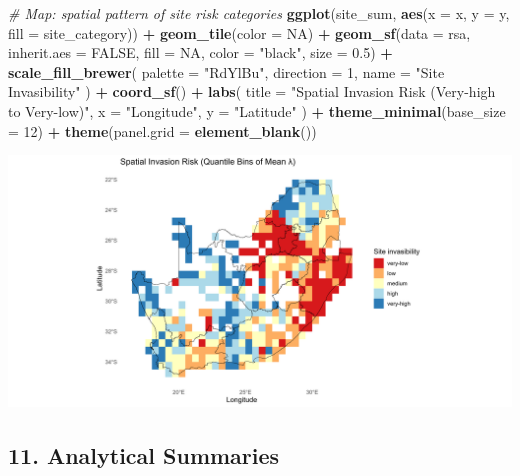 \documentclass[
]{article}
\newenvironment{Shaded}{\begin{snugshade}}{\end{snugshade}}
\newcommand{\AttributeTok}[1]{\textcolor[rgb]{0.13,0.29,0.53}{#1}}
\newcommand{\CommentTok}[1]{\textcolor[rgb]{0.56,0.35,0.01}{\textit{#1}}}
\newcommand{\ConstantTok}[1]{\textcolor[rgb]{0.56,0.35,0.01}{#1}}
\newcommand{\DecValTok}[1]{\textcolor[rgb]{0.00,0.00,0.81}{#1}}
\newcommand{\FloatTok}[1]{\textcolor[rgb]{0.00,0.00,0.81}{#1}}
\newcommand{\FunctionTok}[1]{\textcolor[rgb]{0.13,0.29,0.53}{\textbf{#1}}}
\newcommand{\NormalTok}[1]{#1}
\newcommand{\SpecialCharTok}[1]{\textcolor[rgb]{0.81,0.36,0.00}{\textbf{#1}}}
\newcommand{\StringTok}[1]{\textcolor[rgb]{0.31,0.60,0.02}{#1}}
\begin{document}
\begin{Shaded}
\begin{Highlighting}[]
\CommentTok{\# Map: spatial pattern of site risk categories}
\FunctionTok{ggplot}\NormalTok{(site\_sum, }\FunctionTok{aes}\NormalTok{(}\AttributeTok{x =}\NormalTok{ x, }\AttributeTok{y =}\NormalTok{ y, }\AttributeTok{fill =}\NormalTok{ site\_category)) }\SpecialCharTok{+}
  \FunctionTok{geom\_tile}\NormalTok{(}\AttributeTok{color =} \ConstantTok{NA}\NormalTok{) }\SpecialCharTok{+}
  \FunctionTok{geom\_sf}\NormalTok{(}\AttributeTok{data =}\NormalTok{ rsa, }\AttributeTok{inherit.aes =} \ConstantTok{FALSE}\NormalTok{, }\AttributeTok{fill =} \ConstantTok{NA}\NormalTok{, }\AttributeTok{color =} \StringTok{"black"}\NormalTok{, }\AttributeTok{size =} \FloatTok{0.5}\NormalTok{) }\SpecialCharTok{+}
  \FunctionTok{scale\_fill\_brewer}\NormalTok{(}
    \AttributeTok{palette =} \StringTok{"RdYlBu"}\NormalTok{,}
    \AttributeTok{direction =} \DecValTok{1}\NormalTok{,}
    \AttributeTok{name =} \StringTok{"Site Invasibility"}
\NormalTok{  ) }\SpecialCharTok{+}
  \FunctionTok{coord\_sf}\NormalTok{() }\SpecialCharTok{+}
  \FunctionTok{labs}\NormalTok{(}
    \AttributeTok{title =} \StringTok{"Spatial Invasion Risk (Very{-}high to Very{-}low)"}\NormalTok{,}
    \AttributeTok{x =} \StringTok{"Longitude"}\NormalTok{,}
    \AttributeTok{y =} \StringTok{"Latitude"}
\NormalTok{  ) }\SpecialCharTok{+}
  \FunctionTok{theme\_minimal}\NormalTok{(}\AttributeTok{base\_size =} \DecValTok{12}\NormalTok{) }\SpecialCharTok{+}
  \FunctionTok{theme}\NormalTok{(}\AttributeTok{panel.grid =} \FunctionTok{element\_blank}\NormalTok{())}
\end{Highlighting}
\end{Shaded}

\includegraphics[width=1\linewidth]{man/figures/README-map-risk-1}

\hypertarget{analytical-summaries}{%
\subsection{11. Analytical Summaries}\label{analytical-summaries}}
\end{document}
